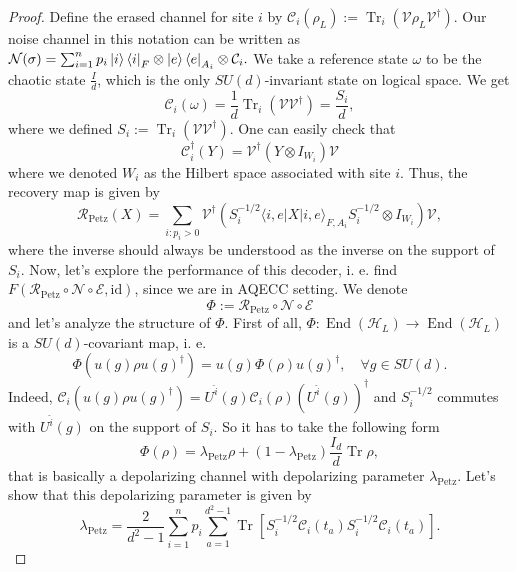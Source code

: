\documentclass[10pt,twocolumn,superscriptaddress,aps,amsmath,amssymb,citeautoscript,floatfix,prx]{revtex4-2}
\theoremstyle{plain}
\theoremstyle{plain}
\theoremstyle{plain}
\theoremstyle{plain}
\theoremstyle{plain}
\theoremstyle{plain}
\theoremstyle{plain}
\theoremstyle{definition}
\theoremstyle{plain}
\begin{document}
\begin{appendix}
\begin{proof}
Define the erased channel for site $i$ by
$
    \mathcal{C}_i\left(\rho_L\right):=\operatorname{Tr}_{i}\left(\mathcal{V} \rho_L \mathcal{V}^{\dagger}\right).
$
Our noise channel in this notation can be written as
$
    \mathcal{N}(\sigma)=\sum_{i=1}^n p_i\ket{i}\bra{i}_F \otimes \ket{e}\bra{e}_{A_i}\otimes \mathcal{C}_i.
$
We take a reference state $\omega$ to be the chaotic state $\frac{I}{d}$, which is the only $SU(d)$-invariant state on logical space. We get
\[
    \mathcal{C}_i\left(\omega\right)=\frac{1}{d} \operatorname{Tr}_i\left(\mathcal{V} \mathcal{V}^{\dagger}\right)=\frac{S_i}{d},
\]
where we defined $S_i:=\operatorname{Tr}_i\left(\mathcal{V} \mathcal{V}^{\dagger}\right)$. One can easily check that
\[
    \mathcal{C}_i^{\dagger}(Y)=\mathcal{V}^{\dagger}\left(Y \otimes I_{W_i}\right) \mathcal{V}
\]
where we denoted $W_i$ as the Hilbert space associated with site $i$. Thus, the recovery map is given by
\[
    \mathcal{R}_{\mathrm{Petz}}(X)=\sum_{i: p_i>0} \mathcal{V}^{\dagger}\left(S_i^{-1 / 2} \langle i, e| X|i,e\rangle_{F, A_i} S_i^{-1 / 2} \otimes I_{W_i}\right) \mathcal{V},
\]
where the inverse should always be understood as the inverse on the support of $S_i$. Now, let's explore the performance of this decoder, 
i. e. find $F\left(\mathcal{R}_{\mathrm{Petz}} \circ \mathcal{N}\circ \mathcal{E}, \mathrm{id}\right)$, since we 
are in AQECC setting. We denote
\[
    \Phi:=\mathcal{R}_{\mathrm{Petz}} \circ \mathcal{N}\circ \mathcal{E}
\]
and let's analyze the structure of $\Phi$. First of all, $\Phi: \operatorname{End}(\mathcal{H}_L)\rightarrow \operatorname{End}(\mathcal{H}_L)$ is a 
$SU(d)$-covariant map, i. e.
\[
    \Phi\left(u(g) \rho u(g)^{\dagger}\right)=u(g) \Phi(\rho) u(g)^{\dagger}, \quad \forall g \in SU(d).
\]
Indeed, $\mathcal{C}_i\left(u(g) \rho u(g)^{\dagger}\right)=U^{\hat{i}}(g) \mathcal{C}_i(\rho) \left(U^{\hat{i}}(g)\right)^{\dagger}$ and $S_i^{-1 / 2}$ 
commutes with $U^{\hat{i}}(g)$ on the support of $S_i$. So it has to take the following form
\[
    \Phi(\rho)=\lambda_{\mathrm{Petz}} \rho+\left(1-\lambda_{\mathrm{Petz}}\right) \frac{I_d}{d} \operatorname{Tr} \rho,
\]
that is basically a depolarizing channel with depolarizing parameter $\lambda_{\mathrm{Petz}}$. Let's show that this depolarizing parameter is given by
\begin{equation}\label{eq:lambdaPetz}
    \lambda_{\text{Petz}}=\frac{2}{d^2-1}\sum_{i=1}^n p_i \sum_{a=1}^{d^2-1} \operatorname{Tr}\left[S_i^{-1 / 2} \mathcal{C}_i\left(t_a\right) 
    S_i^{-1 / 2} \mathcal{C}_i\left(t_a\right)\right] .

\end{equation}
\end{proof}
\end{appendix}
\end{document}
